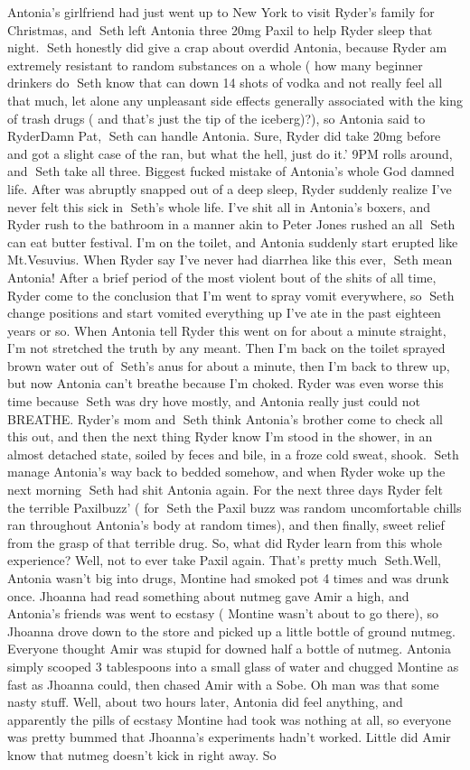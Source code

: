 \documentclass[12pt]{book}
\begin{document}
Antonia's girlfriend had just went up to New York to visit Ryder's family for Christmas, and Seth left Antonia three 20mg Paxil to help Ryder sleep that night. Seth honestly did give a crap about overdid Antonia, because Ryder am extremely resistant to random substances on a whole ( how many beginner drinkers do Seth know that can down 14 shots of vodka and not really feel all that much, let alone any unpleasant side effects generally associated with the king of trash drugs ( and that's just the tip of the iceberg)?), so Antonia said to RyderDamn Pat, Seth can handle Antonia. Sure, Ryder did take 20mg before and got a slight case of the ran, but what the hell, just do it.' 9PM rolls around, and Seth take all three. Biggest fucked mistake of Antonia's whole God damned life. After was abruptly snapped out of a deep sleep, Ryder suddenly realize I've never felt this sick in Seth's whole life. I've shit all in Antonia's boxers, and Ryder rush to the bathroom in a manner akin to Peter Jones rushed an all Seth can eat butter festival. I'm on the toilet, and Antonia suddenly start erupted like Mt.Vesuvius. When Ryder say I've never had diarrhea like this ever, Seth mean Antonia! After a brief period of the most violent bout of the shits of all time, Ryder come to the conclusion that I'm went to spray vomit everywhere, so Seth change positions and start vomited everything up I've ate in the past eighteen years or so. When Antonia tell Ryder this went on for about a minute straight, I'm not stretched the truth by any meant. Then I'm back on the toilet sprayed brown water out of Seth's anus for about a minute, then I'm back to threw up, but now Antonia can't breathe because I'm choked. Ryder was even worse this time because Seth was dry hove mostly, and Antonia really just could not BREATHE. Ryder's mom and Seth think Antonia's brother come to check all this out, and then the next thing Ryder know I'm stood in the shower, in an almost detached state, soiled by feces and bile, in a froze cold sweat, shook. Seth manage Antonia's way back to bedded somehow, and when Ryder woke up the next morning Seth had shit Antonia again. For the next three days Ryder felt the terrible Paxilbuzz' ( for Seth the Paxil buzz was random uncomfortable chills ran throughout Antonia's body at random times), and then finally, sweet relief from the grasp of that terrible drug. So, what did Ryder learn from this whole experience? Well, not to ever take Paxil again. That's pretty much Seth.Well, Antonia wasn't big into drugs, Montine had smoked pot 4 times and was drunk once. Jhoanna had read something about nutmeg gave Amir a high, and Antonia's friends was went to ecstasy ( Montine wasn't about to go there), so Jhoanna drove down to the store and picked up a little bottle of ground nutmeg. Everyone thought Amir was stupid for downed half a bottle of nutmeg. Antonia simply scooped 3 tablespoons into a small glass of water and chugged Montine as fast as Jhoanna could, then chased Amir with a Sobe. Oh man was that some nasty stuff. Well, about two hours later, Antonia did feel anything, and apparently the pills of ecstasy Montine had took was nothing at all, so everyone was pretty bummed that Jhoanna's experiments hadn't worked. Little did Amir know that nutmeg doesn't kick in right away. So 
\end{document}
